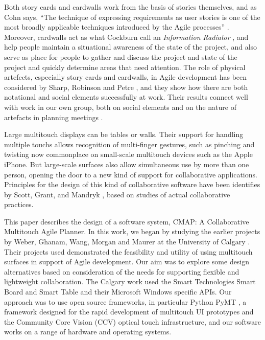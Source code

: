 \documentclass[lnbip,sechang,a4paper]{svmultln}
\begin{document}
Both story cards and cardwalls work from the basis of stories
themselves, and as Cohn says, ``The technique of expressing
requirements as user stories is one of the most broadly applicable
techniques introduced by the Agile processes'' \cite{StoriesRequ}.
Moreover, cardwalls act as what Cockburn call an {\em Information
  Radiator} \cite{InfoRad}, and help people maintain a situational
awareness of the state of the project, and also serve as place for
people to gather and discuss the project and state of the project and
quickly determine areas that need attention.  The role of physical
artefects, especially story cards and cardwalls, in Agile development
has been considered by Sharp, Robinson and Petre \cite{cite}, and they
show how there are both notational and social elements successfully at
work. Their results connect well with work in our own group, both on
social elements \cite{EWAgile} and on the nature of artefacts in
planning meetings \cite{JBAgile}. 

Large multitouch displays can be tables or walls. Their support for
handling multiple touchs allows recognition of multi-finger gestures,
such as pinching and twisting now commonplace on small-scale
multitouch devices such as the Apple iPhone.  But large-scale surfaces
also allow simultaneous use by more than one person, opening the door
to a new kind of support for collaborative applications. Principles for
the design of this kind of collaborative software have been identifies
by Scott, Grant, and Mandryk \cite{ScottGuidelines}, based on studies
of actual collaborative practices.

This paper describes the design of a software system, CMAP: A
Collaborative Multitouch Agile Planner. In this work, we began by
studying the earlier projects by Weber, Ghanam, Wang, Morgan and
Maurer at the University of Calgary \cite{Wang,Webber,DAP}. Their
projects used demonstrated the feasibility and utility of using
multitouch surfaces in support of Agile development. Our aim was to
explore some design alternatives based on consideration of the needs
for supporting flexible and lightweight collaboration. The Calgary
work used the Smart Technologies Smart Board and Smart Table and their
Microsoft Windows specific APIs. Our approach was to use open source
frameworks, in particular Python PyMT \cite{PyMt}, a framework
designed for the rapid development of multitouch UI prototypes and the
Community Core Vision (CCV) optical touch infrastructure, and our
software works on a range of hardware and operating systems.
\end{document}
